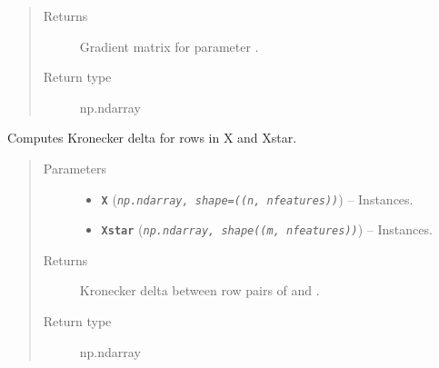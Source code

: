 \documentclass[letterpaper,10pt,english]{sphinxmanual}
\begin{document}
\begin{fulllineitems}
\begin{fulllineitems}
\begin{quote}
\begin{description}
\begin{itemize}
\end{itemize}

\item[{Returns}] \leavevmode
Gradient matrix for parameter .

\item[{Return type}] \leavevmode
np.ndarray

\end{description}\end{quote}

\end{fulllineitems}


\end{fulllineitems}


\begin{fulllineitems}
\label{pyGPGO.covfunc:pyGPGO.covfunc.kronDelta}
Computes Kronecker delta for rows in X and Xstar.
\begin{quote}\begin{description}
\item[{Parameters}] \leavevmode\begin{itemize}
\item {} 
\textbf{\texttt{X}} (\emph{\texttt{np.ndarray, shape=((n, nfeatures))}}) -- Instances.

\item {} 
\textbf{\texttt{Xstar}} (\emph{\texttt{np.ndarray, shape((m, nfeatures))}}) -- Instances.

\end{itemize}

\item[{Returns}] \leavevmode
Kronecker delta between row pairs of  and .

\item[{Return type}] \leavevmode
np.ndarray

\end{description}\end{quote}

\end{fulllineitems}

\end{document}
